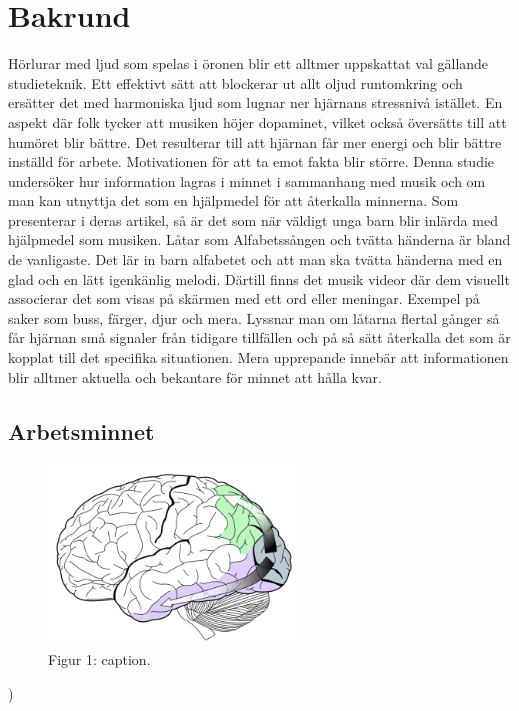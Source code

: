 \documentclass[11p]{article}
\begin{document}
    \section{Bakrund}
    Hörlurar med ljud som spelas i öronen blir ett alltmer uppskattat val gällande studieteknik.
    Ett effektivt sätt att blockerar ut allt oljud runtomkring och ersätter det med harmoniska ljud som lugnar ner hjärnans stressnivå istället.
    En aspekt där folk tycker att musiken höjer dopaminet, vilket också översätts till att humöret blir bättre.
    Det resulterar till att hjärnan får mer energi och blir bättre inställd för arbete.
    Motivationen för att ta emot fakta blir större.
    Denna studie undersöker hur information lagras i minnet i sammanhang med musik och om man kan utnyttja det som en hjälpmedel för att återkalla minnerna.
    Som \textcite{Effectsmusic} presenterar i deras artikel, så är det som när väldigt unga barn blir inlärda med hjälpmedel som musiken.
    Låtar som Alfabetssången och tvätta händerna är bland de vanligaste.
    Det lär in barn alfabetet och att man ska tvätta händerna med en glad och en lätt igenkänlig melodi.
    Därtill finns det musik videor där dem visuellt associerar det som visas på skärmen med ett ord eller meningar.
    Exempel på saker som buss, färger, djur och mera.
    Lyssnar man om låtarna flertal gånger så får hjärnan små signaler från tidigare tillfällen och på så sätt återkalla det som är kopplat till det specifika situationen.
    Mera upprepande innebär att informationen blir alltmer aktuella och bekantare för minnet att hålla kvar.

    \subsection{Arbetsminnet}

    \begin{figure}
        \includegraphics[width=0.6\textwidth]{../images/brain.png}
        \caption{Figur 1: caption. }
    \end{figure})
\end{document}
